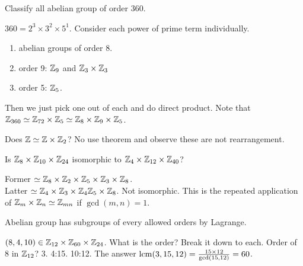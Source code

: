 \documentclass[class=article,crop=false]{standalone}
\begin{document}
\begin{eg}[]
Classify all abelian group of order 360.

$ 360 = 2^3 \times 3^2 \times 5^1$. Consider each power of prime term individually.
\begin{enumerate}[label=\arabic*)]
	\item abelian groups of order 8.
	\item order 9: $ \mathbb{Z}_9$ and $ \mathbb{Z}_3 \times \mathbb{Z}_3$
	\item order 5: $ \mathbb{Z}_5$.
\end{enumerate}
Then we just pick one out of each and do direct product. Note that $ \mathbb{Z}_{360} \simeq \mathbb{Z}_{72} \times \mathbb{Z}_5 \simeq \mathbb{Z}_8 \times \mathbb{Z}_9 \times \mathbb{Z}_5 $.
\end{eg}
\begin{eg}[]
Does $ \mathbb{Z} \simeq \mathbb{Z} \times \mathbb{Z}_2$? No use theorem and observe these are not rearrangement.
\end{eg}
\begin{eg}[11.18]
Is $ \mathbb{Z}_8 \times \mathbb{Z}_{10} \times \mathbb{Z}_{24}$ isomorphic to $ \mathbb{Z}_4 \times \mathbb{Z}_{12} \times \mathbb{Z}_{40}$?

Former $\simeq \mathbb{Z}_8 \times \mathbb{Z}_2 \times \mathbb{Z}_5 \times \mathbb{Z}_3 \times \mathbb{Z}_8$.\\
Latter $ \simeq \mathbb{Z}_4 \times \mathbb{Z}_3 \times \mathbb{Z}_4 \mathbb{Z}_5 \times \mathbb{Z}_8$.
Not isomorphic. This is the repeated application of $ \mathbb{Z}_m \times \mathbb{Z}_n \simeq \mathbb{Z}_{mn}$ if $  \gcd ( m,n) =1$.
\end{eg}

\begin{note}[]
Abelian group has subgroups of every allowed orders by Lagrange.
\end{note}
\begin{eg}[11.10]
	$ (8,4,10) \in \mathbb{Z}_{12} \times \mathbb{Z}_{60} \times \mathbb{Z}_{24}$. What is the order?
	Break it down to each. 
	Order of 8 in $ \mathbb{Z}_{12}$? 3. 4:15. 10:12.
	The answer $ \operatorname{lcm} ( 3,15,12) =  \frac{15 \times 12}{ \gcd ( 15,12) }=60 $.
\end{eg}
\end{document}
